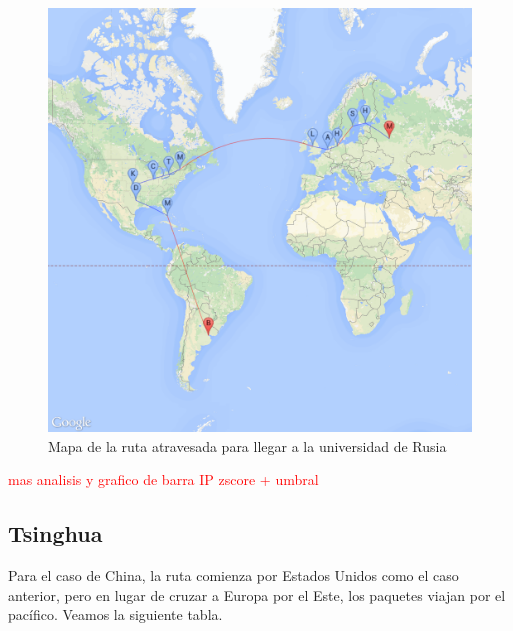 \begin{figure}[H]
	\begin{center}
		  \includegraphics[scale=0.25]{../results/maps/MSU.png}
		  \caption{Mapa de la ruta atravesada para llegar a la universidad de Rusia}
	\end{center}
\end{figure}

\textcolor{red}{mas analisis y grafico de barra IP zscore + umbral}

\subsection{Tsinghua}

Para el caso de China, la ruta comienza por Estados Unidos como el caso anterior, pero en lugar de cruzar a Europa por el Este, los paquetes viajan por el pac\'ifico.
Veamos la siguiente tabla.

~

